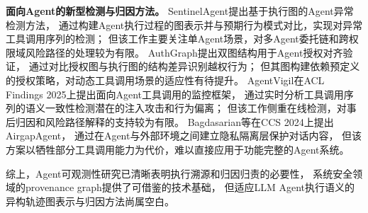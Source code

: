 \textbf{面向Agent的新型检测与归因方法。}
SentinelAgent\cite{he2025sentinelagent}提出基于执行图的Agent异常检测方法，
通过构建Agent执行过程的图表示并与预期行为模式对比，实现对异常工具调用序列的检测；
但该工作主要关注单Agent场景，对多Agent委托链和跨权限域风险路径的处理较为有限。
AuthGraph\cite{wang2026aligning}提出双图结构用于Agent授权对齐验证，
通过对比授权图与执行图的结构差异识别越权行为；
但其图构建依赖预定义的授权策略，对动态工具调用场景的适应性有待提升。
AgentVigil\cite{wang2025agentvigil}在ACL Findings 2025上提出面向Agent工具调用的监控框架，
通过实时分析工具调用序列的语义一致性检测潜在的注入攻击和行为偏离；
但该工作侧重在线检测，对事后归因和风险路径解释的支持较为有限。
Bagdasarian等\cite{bagdasarian2024airgapagent}在CCS 2024上提出AirgapAgent，
通过在Agent与外部环境之间建立隐私隔离层保护对话内容，
但该方案以牺牲部分工具调用能力为代价，难以直接应用于功能完整的Agent系统。

综上，Agent可观测性研究已清晰表明执行溯源和归因归责的必要性，
系统安全领域的provenance graph提供了可借鉴的技术基础，
但适应LLM Agent执行语义的异构轨迹图表示与归因方法尚属空白。
